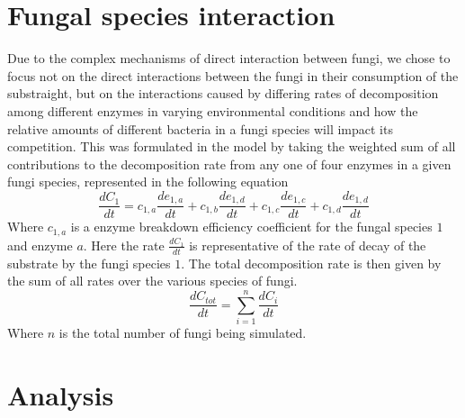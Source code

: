 \documentclass[10pt]{article}
\begin{document}
\section*{Fungal species interaction}
Due to the complex mechanisms of direct interaction between fungi, we chose to focus not on the direct interactions between the fungi in their consumption of the substraight, but on the interactions caused by differing rates of decomposition among different enzymes in varying environmental conditions and how the relative amounts of different bacteria in a fungi species will impact its competition. This was formulated in the model by taking the weighted sum of all contributions to the decomposition rate from any one of four enzymes in a given fungi species, represented in the following equation
\begin{equation} \label{eq}
    \frac{dC_{1}}{dt} = c_{1,a}\frac{de_{1,a}}{dt} + c_{1,b}\frac{de_{1,d}}{dt} + c_{1,c}\frac{de_{1,c}}{dt} + c_{1,d}\frac{de_{1,d}}{dt}
\end{equation}
Where $c_{1,a}$ is a enzyme breakdown efficiency coefficient for the fungal species $1$ and enzyme $a$. Here the rate $\frac{dC_{1}}{dt}$ is representative of the rate of decay of the substrate by the fungi species $1$. The total decomposition rate is then given by the sum of all rates over the various species of fungi.
\begin{equation} \label{eq}
    \frac{dC_{tot}}{dt} = \sum_{i=1}^{n}\frac{dC_{i}}{dt}
\end{equation}
Where $n$ is the total number of fungi being simulated. 

\section*{Analysis}
\end{document}
